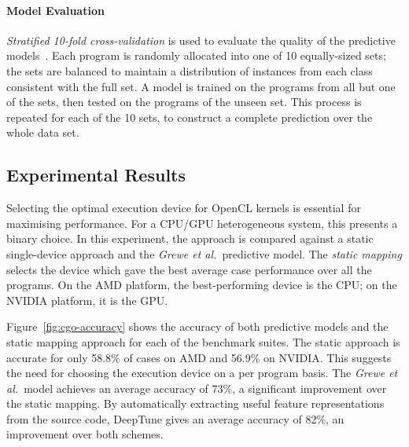\paragraph*{Model Evaluation} 

\emph{Stratified 10-fold cross-validation} is used to evaluate the quality of the predictive models~\cite{Han2011}. Each program is randomly allocated into one of 10 equally-sized sets; the sets are balanced to maintain a distribution of instances from each class consistent with the full set. A model is trained on the programs from all but one of the sets, then tested on the programs of the unseen set. This process is repeated for each of the 10 sets, to construct a complete prediction over the whole data set.




\subsection{Experimental Results}

Selecting the optimal execution device for OpenCL kernels is essential for maximising performance. For a CPU/GPU heterogeneous system, this presents a binary choice. In this experiment, the approach is compared against a static single-device approach and the \emph{Grewe et al.\ }predictive model. The \emph{static mapping} selects the device which gave the best average case performance over all the programs. On the AMD platform, the best-performing device is the CPU; on the NVIDIA platform, it is the GPU.

Figure~\ref{fig:cgo-accuracy} shows the accuracy of both predictive models and the static mapping approach for each of the benchmark suites. The static approach is accurate for only 58.8\% of cases on AMD and 56.9\% on NVIDIA. This suggests the need for choosing the execution device on a per program basis. The \emph{Grewe et al.\ }model achieves an average accuracy of 73\%, a significant improvement over the static mapping. By automatically extracting useful feature representations from the source code, DeepTune gives an average accuracy of 82\%, an improvement over both schemes.

